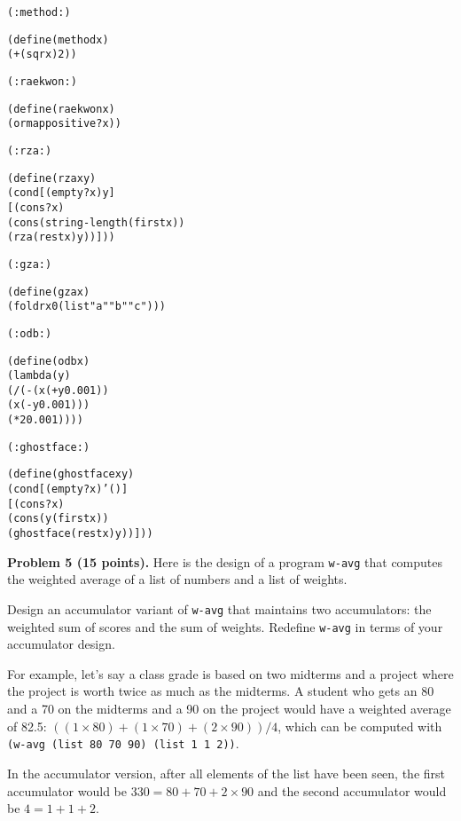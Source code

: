 \documentclass[12pt]{article}
\begin{document}
\begin{alltt}
(: method : )

(define (method x)
  (+ (sqr x) 2))

(: raekwon : )

(define (raekwon x)
  (ormap positive? x))

(: rza : )

(define (rza x y)
  (cond [(empty? x) y]
        [(cons? x)
         (cons (string-length (first x))
               (rza (rest x) y))]))

(: gza : )

(define (gza x)
  (foldr x 0 (list "a" "b" "c")))

(: odb : )

(define (odb x)
  (lambda (y)   
    (/ (- (x (+ y 0.001))
          (x (- y 0.001)))
       (* 2 0.001))))
    

(: ghostface : )

(define (ghostface x y)
  (cond [(empty? x) '()]
        [(cons? x)
         (cons (y (first x)) 
               (ghostface (rest x) y))]))
\end{alltt}


\newpage

\noindent
{\bf Problem 5 (15 points).}
%
Here is the design of a program {\tt w-avg} that computes the weighted
average of a list of numbers and a list of weights.

Design an accumulator variant of {\tt w-avg} that maintains two
accumulators: the weighted sum of scores and the sum of weights.
Redefine {\tt w-avg} in terms of your accumulator design.

For example, let's say a class grade is based on two midterms and a
project where the project is worth twice as much as the midterms.  A
student who gets an 80 and a 70 on the midterms and a 90 on the
project would have a weighted average of 82.5: $((1 \times 80) + (1
\times 70) + (2 \times 90)) / 4$, which can be computed with {\tt
  (w-avg (list 80 70 90) (list 1 1 2))}.

In the accumulator version, after all elements of the list have been
seen, the first accumulator would be $330 = 80+70+2\times 90$ and
the second accumulator would be $4 =1+1+2$.
\end{document}
